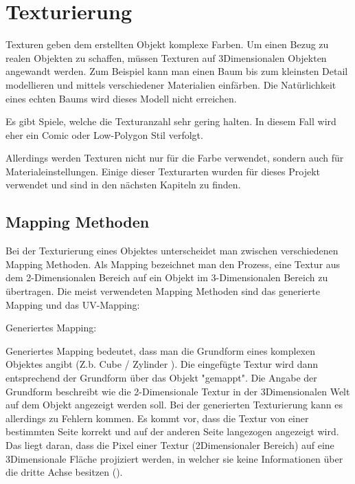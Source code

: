 \section{Texturierung}
\label{sec:tex}
Texturen geben dem erstellten Objekt komplexe Farben. Um einen Bezug zu realen Objekten zu schaffen, müssen Texturen
auf 3Dimensionalen Objekten angewandt werden. Zum Beispiel kann man einen Baum bis
zum kleinsten Detail modellieren und mittels verschiedener Materialien einfärben. Die Natürlichkeit
eines echten Baums wird dieses Modell nicht erreichen.

Es gibt Spiele, welche die Texturanzahl sehr gering halten. In diesem Fall wird eher ein Comic
oder Low-Polygon Stil verfolgt.

Allerdings werden Texturen nicht nur für die Farbe verwendet, sondern auch für Materialeinstellungen.
Einige dieser Texturarten wurden für dieses Projekt verwendet und
sind in den nächsten Kapiteln zu finden.

\subsection{Mapping Methoden}
\label{sec:tex_mapping}

Bei der Texturierung eines Objektes unterscheidet man zwischen verschiedenen Mapping Methoden. Als Mapping bezeichnet man
den Prozess, eine Textur aus dem 2-Dimensionalen Bereich auf ein Objekt im 3-Dimensionalen Bereich zu übertragen. Die
meist verwendeten Mapping Methoden sind das generierte Mapping und das UV-Mapping\citep{blender:tex_mapping_modes}:


Generiertes Mapping:

Generiertes Mapping bedeutet, dass man die Grundform eines komplexen Objektes angibt (Z.b. Cube / Zylinder ). Die
eingefügte Textur wird dann entsprechend der Grundform über das Objekt "gemappt". Die Angabe der Grundform beschreibt
wie die 2-Dimensionale Textur in der 3Dimensionalen Welt auf dem Objekt angezeigt werden soll.
Bei der generierten Texturierung kann es allerdings zu Fehlern kommen. Es kommt vor, dass die Textur von einer
bestimmten Seite korrekt und auf der anderen Seite langezogen angezeigt wird. Das liegt daran, dass die Pixel einer
Textur (2Dimensionaler Bereich) auf eine 3Dimensionale Fläche projiziert werden, in welcher sie keine Informationen
über die dritte Achse besitzen ().

